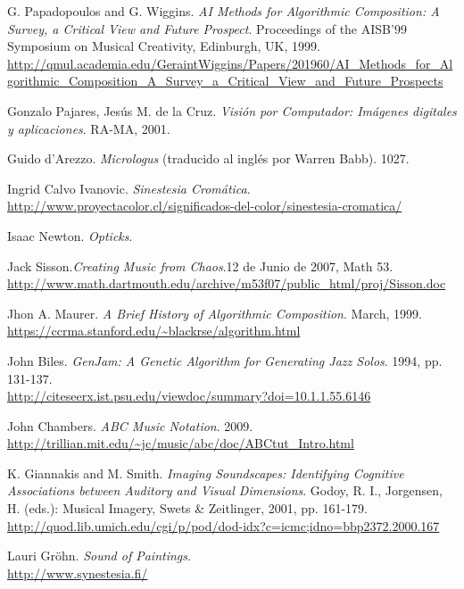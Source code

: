 \begin{thebibliography}{9}
 G. Papadopoulos and G. Wiggins. \emph{AI Methods for Algorithmic Composition: A Survey, a Critical View  and Future Prospect}. Proceedings of the AISB’99 Symposium on Musical Creativity, Edinburgh, UK, 1999.\\
 \url{http://qmul.academia.edu/GeraintWiggins/Papers/201960/AI_Methods_for_Algorithmic_Composition_A_Survey_a_Critical_View_and_Future_Prospects}

 Gonzalo Pajares, Jesús M. de la Cruz. \emph{Visión por Computador: Imágenes digitales y aplicaciones}. RA-MA, 2001.

 Guido d'Arezzo. \emph{Micrologus} (traducido al inglés por Warren Babb). 1027.

 Ingrid Calvo Ivanovic. \emph{Sinestesia Cromática}.
 \url{http://www.proyectacolor.cl/significados-del-color/sinestesia-cromatica/}

 Isaac Newton. \emph{Opticks}.

Jack Sisson.\emph{Creating Music from Chaos}.12 de Junio de 2007, Math 53.\\
\url{http://www.math.dartmouth.edu/archive/m53f07/public_html/proj/Sisson.doc}

 Jhon A. Maurer. \emph{A Brief History of Algorithmic Composition}. March, 1999.
 \url{https://ccrma.stanford.edu/~blackrse/algorithm.html}

 John Biles. \emph{GenJam: A Genetic Algorithm for Generating Jazz Solos}. 1994, pp. 131-137.\\
 \url{http://citeseerx.ist.psu.edu/viewdoc/summary?doi=10.1.1.55.6146}

  John Chambers. \emph{ABC Music Notation}. 2009.\\
  \url{http://trillian.mit.edu/~jc/music/abc/doc/ABCtut_Intro.html}
 
 K. Giannakis and M. Smith. \emph{Imaging Soundscapes: Identifying Cognitive Associations between Auditory and Visual Dimensions}. Godoy, R. I., Jorgensen, H. (eds.): Musical Imagery, Swets \& Zeitlinger, 2001, pp. 161-179.\\
 \url{http://quod.lib.umich.edu/cgi/p/pod/dod-idx?c=icmc;idno=bbp2372.2000.167}

Lauri Gröhn. \emph{Sound of Paintings}.\\
\url{http://www.synestesia.fi/}


\end{thebibliography}
